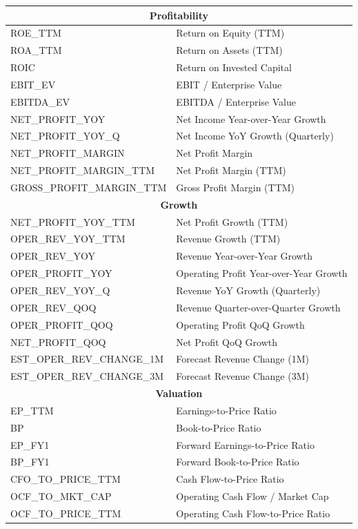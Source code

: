 \documentclass{article}
\begin{document}
\begin{longtable}{@{}ll@{}}
\multicolumn{2}{c}{\textbf{Profitability}} \\
\midrule
ROE\_TTM & Return on Equity (TTM) \\
ROA\_TTM & Return on Assets (TTM) \\
ROIC & Return on Invested Capital \\
EBIT\_EV & EBIT / Enterprise Value \\
EBITDA\_EV & EBITDA / Enterprise Value \\
NET\_PROFIT\_YOY & Net Income Year-over-Year Growth \\
NET\_PROFIT\_YOY\_Q & Net Income YoY Growth (Quarterly) \\
NET\_PROFIT\_MARGIN & Net Profit Margin \\
NET\_PROFIT\_MARGIN\_TTM & Net Profit Margin (TTM) \\
GROSS\_PROFIT\_MARGIN\_TTM & Gross Profit Margin (TTM) \\
\midrule
\multicolumn{2}{c}{\textbf{Growth}} \\
\midrule
NET\_PROFIT\_YOY\_TTM & Net Profit Growth (TTM) \\
OPER\_REV\_YOY\_TTM & Revenue Growth (TTM) \\
OPER\_REV\_YOY & Revenue Year-over-Year Growth \\
OPER\_PROFIT\_YOY & Operating Profit Year-over-Year Growth \\
OPER\_REV\_YOY\_Q & Revenue YoY Growth (Quarterly) \\
OPER\_REV\_QOQ & Revenue Quarter-over-Quarter Growth \\
OPER\_PROFIT\_QOQ & Operating Profit QoQ Growth \\
NET\_PROFIT\_QOQ & Net Profit QoQ Growth \\
EST\_OPER\_REV\_CHANGE\_1M & Forecast Revenue Change (1M) \\
EST\_OPER\_REV\_CHANGE\_3M & Forecast Revenue Change (3M) \\
\midrule
\multicolumn{2}{c}{\textbf{Valuation}} \\
\midrule
EP\_TTM & Earnings-to-Price Ratio \\
BP & Book-to-Price Ratio \\
EP\_FY1 & Forward Earnings-to-Price Ratio \\
BP\_FY1 & Forward Book-to-Price Ratio \\
CFO\_TO\_PRICE\_TTM & Cash Flow-to-Price Ratio \\
OCF\_TO\_MKT\_CAP & Operating Cash Flow / Market Cap \\
OCF\_TO\_PRICE\_TTM & Operating Cash Flow-to-Price Ratio \\

\end{longtable}
\end{document}
